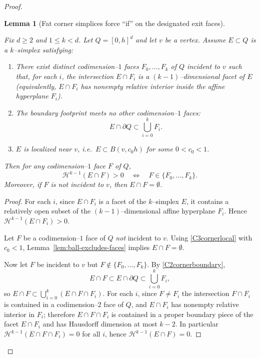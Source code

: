 \documentclass[11pt]{article}
\numberwithin{equation}{section}  %
\theoremstyle{plain}
\newtheorem{lemma}[theorem]{Lemma}
\theoremstyle{definition}
\theoremstyle{remark}
\begin{document}
\begin{proof}
\begin{lemma}[{Fat corner simplices force ``if'' on the designated exit faces}]\label{lem:corner-simplex-hits-designated-faces}

Fix $d\ge 2$ and $1\le k<d$.  Let $Q=[0,h]^d$ and let $v$ be a vertex.
Assume $E\subset Q$ is a $k$--simplex satisfying:
\begin{enumerate}
\item[\textup{(C1)}]\label{C1cornerfaces}
There exist \emph{distinct} codimension--$1$ faces $F_0,\dots,F_k$ of $Q$ incident to $v$ such that, for each $i$, the intersection $E\cap F_i$ is a $(k-1)$--dimensional \emph{facet} of $E$ (equivalently, $E\cap F_i$ has nonempty relative interior inside the affine hyperplane $F_i$).
\item[\textup{(C2)}]\label{C2cornerboundary}
The boundary footprint meets no other codimension--$1$ faces:
\[
E\cap \partial Q \subset \bigcup_{i=0}^k F_i.
\]
\item[\textup{(C3)}]\label{C3cornerlocal}
$E$ is localized near $v$, i.e.\ $E\subset B(v,c_0h)$ for some $0<c_0<1$.
\end{enumerate}
Then for any codimension--$1$ face $F$ of $Q$,
\[
\mathcal H^{k-1}(E\cap F)>0
\quad\Longleftrightarrow\quad
F\in\{F_0,\dots,F_k\}.
\]
Moreover, if $F$ is not incident to $v$, then $E\cap F=\emptyset$.

\end{lemma}

\begin{proof}

For each $i$, since $E\cap F_i$ is a facet of the $k$--simplex $E$, it contains a relatively open subset of the $(k-1)$--dimensional affine hyperplane $F_i$. Hence $\mathcal H^{k-1}(E\cap F_i)>0$.

Let $F$ be a codimension--$1$ face of $Q$ \emph{not} incident to $v$.  Using \eqref{C3cornerlocal} with $c_0<1$, Lemma~\ref{lem:ball-excludes-faces} implies $E\cap F=\emptyset$.

Now let $F$ be incident to $v$ but $F\notin\{F_0,\dots,F_k\}$.  By \eqref{C2cornerboundary},
\[
E\cap F \subset E\cap\partial Q \subset \bigcup_{i=0}^k F_i,
\]
so $E\cap F\subset\bigcup_{i=0}^k (E\cap F\cap F_i)$.  For each $i$, since $F\neq F_i$ the intersection $F\cap F_i$ is contained in a codimension--$2$ face of $Q$, and $E\cap F_i$ has nonempty relative interior in $F_i$; therefore $E\cap F\cap F_i$ is contained in a proper boundary piece of the facet $E\cap F_i$ and has Hausdorff dimension at most $k-2$.  In particular $\mathcal H^{k-1}(E\cap F\cap F_i)=0$ for all $i$, hence $\mathcal H^{k-1}(E\cap F)=0$.


\end{proof}
\end{proof}
\end{document}
